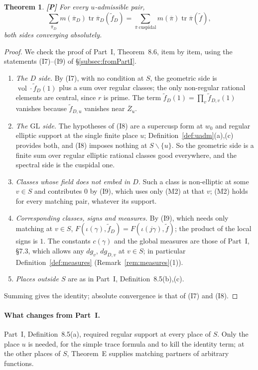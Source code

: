\documentclass[12pt]{article}
\newcommand{\ov}[1]{\overline{#1}}
\newcommand{\tr}{\operatorname{tr}}
\newcommand{\vol}{\operatorname{vol}}
\newcommand{\GL}{\mathrm{GL}}
\newcommand{\Zb}{\ov{Z}}
\newcommand{\pib}{\ov{\pi}}
\newcommand{\Pv}{\textbf{[P]}}
\theoremstyle{plain}
\newtheorem{theorem}{Theorem}[section]
\theoremstyle{definition}
\begin{document}
\begin{theorem}\label{thm:comparison2}\Pv
For every $u$-admissible pair,
\[ \sum_{\pib_D}m(\pib_D)\tr\pib_D(\tilde f_D)=\sum_{\pib\ \mathrm{cuspidal}}m(\pib)\tr\pib(\tilde f), \]
both sides converging absolutely.
\end{theorem}
\begin{proof}
We check the proof of Part~I, Theorem~8.6, item by item, using the statements (I7)--(I9) of \S\ref{subsec:fromPartI}.
\begin{enumerate}[label=(\arabic*)]
\item \emph{The $D$ side.} By (I7), with no condition at $S$, the geometric side is $\vol\cdot\tilde f_D(1)$ plus a sum over regular classes; the only non-regular rational elements are central, since $r$ is prime. The term $\tilde f_D(1)=\prod_v\tilde f_{D,v}(1)$ vanishes because $\tilde f_{D,u}$ vanishes near $\Zb_u$.
\item \emph{The $\GL$ side.} The hypotheses of (I8) are a supercusp form at $w_0$ and regular elliptic support at the single finite place $u$; Definition~\ref{def:uadm}(a),(c) provides both, and (I8) imposes nothing at $S\smallsetminus\{u\}$. So the geometric side is a finite sum over regular elliptic rational classes good everywhere, and the spectral side is the cuspidal one.
\item \emph{Classes whose field does not embed in $D$.} Such a class is non-elliptic at some $v\in S$ and contributes $0$ by (I9), which uses only (M2) at that $v$; (M2) holds for every matching pair, whatever its support.
\item \emph{Corresponding classes, signs and measures.} By (I9), which needs only matching at $v\in S$, $F(\iota(\gamma),\tilde f_D)=F(\iota(j\gamma),\tilde f)$; the product of the local signs is $1$. The constants $c(\gamma)$ and the global measures are those of Part~I, \S7.3, which allows any $dg_v$, $dg_{D,v}$ at $v\in S$; in particular Definition~\ref{def:measures} (Remark~\ref{rem:measures}(1)).
\item \emph{Places outside $S$} are as in Part~I, Definition~8.5(b),(c).
\end{enumerate}
Summing gives the identity; absolute convergence is that of (I7) and (I8).
\end{proof}

\paragraph{What changes from Part~I.} Part~I, Definition~8.5(a), required regular support at every place of $S$. Only the place $u$ is needed, for the simple trace formula and to kill the identity term; at the other places of $S$, Theorem~E supplies matching partners of arbitrary functions.
\end{document}
